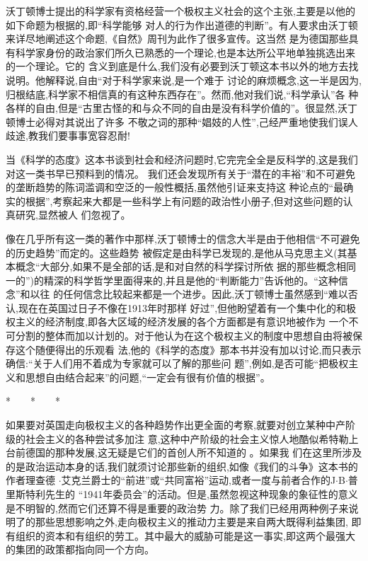 ﻿\documentclass[12pt]{article}
\begin{document}
沃丁顿博士提出的科学家有资格经营一个极权主义社会的这个主张,主要是以他的如下命题为根据的,即``科学能够
对人的行为作出道德的判断''。有人要求由沃丁顿来详尽地阐述这个命题,《自然》周刊为此作了很多宣传。这当然
是为德国那些具有科学家身份的政治家们所久已熟悉的一个理论,也是本达所公平地单独挑选出来的一个理论。它的
含义到底是什么,我们没有必要到沃丁顿这本书以外的地方去找说明。他解释说,自由``对于科学家来说,是一个难于
讨论的麻烦概念,这一半是因为,归根结底,科学家不相信真的有这种东西存在''。然而,他对我们说,``科学承认''各
种各样的自由,但是``古里古怪的和与众不同的自由是没有科学价值的''。很显然,沃丁顿博士必得对其说出了许多
不敬之词的那种``娼妓的人性'',己经严重地使我们误人歧途,教我们要事事宽容忍耐!

当《科学的态度》这本书谈到社会和经济问题时,它完完全全是反科学的,这是我们对这一类书早已预料到的情况。
我们还会发现所有关于``潜在的丰裕''和不可避免的垄断趋势的陈词滥调和空泛的一般性概括,虽然他引证来支持这
种论点的``最确实的根据'',考察起来大都是一些科学上有问题的政治性小册子,但对这些问题的认真研究,显然被人
们忽视了。

像在几乎所有这一类的著作中那样,沃丁顿博士的信念大半是由于他相信``不可避免的历史趋势''而定的。这些趋势
被假定是由科学已发现的,是他从马克思主义(其基本概念``大部分,如果不是全部的话,是和对自然的科学探讨所依
据的那些概念相同一的'')的精深的科学哲学里面得来的,并且是他的``判断能力''告诉他的。``这种信念''和以往
的任何信念比较起来都是一个进步。因此,沃丁顿博士虽然感到``难以否认,现在在英国过日子不像在1913年时那样
好过'',但他盼望着有一个集中化的和极权主义的经济制度,即各大区域的经济发展的各个方面都是有意识地被作为
一个不可分割的整体而加以计划的。对于他认为在这个极权主义的制度中思想自由将被保存这个随便得出的乐观看
法,他的《科学的态度》那本书并没有加以讨论,而只表示确信:``关于人们用不着成为专家就可以了解的那些问
题'',例如,是否可能``把极权主义和思想自由结合起来''的问题,``一定会有很有价值的根据''。

*　　*　　*

如果要对英国走向极权主义的各种趋势作出更全面的考察,就要对创立某种中产阶级的社会主义的各种尝试多加注
意,这种中产阶级的社会主义惊人地酷似希特勒上台前德国的那种发展,这无疑是它们的首创人所不知道的 。如果我
们在这里所涉及的是政治运动本身的话,我们就须讨论那些新的组织,如像《我们的斗争》这本书的作者理查德
$\cdot$艾克兰爵士的``前进''或``共同富裕''运动,或者一度与前者合作的J$\cdot$B$\cdot$普里斯特利先生的
``1941年委员会''的活动。但是,虽然忽视这种现象的象征性的意义是不明智的,然而它们还算不得是重要的政治势
力。除了我们已经用两种例子来说明了的那些思想影响之外,走向极权主义的推动力主要是来自两大既得利益集团,
即有组织的资本和有组织的劳工。其中最大的威胁可能是这一事实,即这两个最强大的集团的政策都指向同一个方向。
\end{document}
